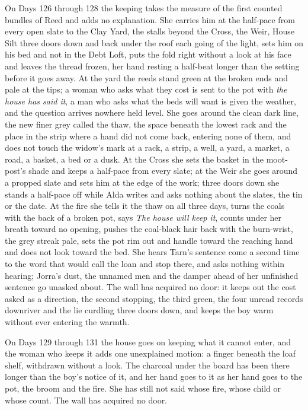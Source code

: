 \documentclass{design/chronicle}
\begin{document}
{On Days 126 through 128 the keeping takes the measure of the first counted bundles of Reed and adds no explanation. She carries him at the half-pace from every open slate to the Clay Yard, the stalls beyond the Cross, the Weir, House Silt three doors down and back under the roof each going of the light, sets him on his bed and not in the Debt Loft, puts the fold right without a look at his face and leaves the thread frozen, her hand resting a half-beat longer than the setting before it goes away. At the yard the reeds stand green at the broken ends and pale at the tips; a woman who asks what they cost is sent to the pot with \emph{the house has said it}, a man who asks what the beds will want is given the weather, and the question arrives nowhere held level. She goes around the clean dark line, the new finer grey called the thaw, the space beneath the lowest rack and the place in the strip where a hand did not come back, entering none of them, and does not touch the widow’s mark at a rack, a strip, a well, a yard, a market, a road, a basket, a bed or a dusk. At the Cross she sets the basket in the moot-post’s shade and keeps a half-pace from every slate; at the Weir she goes around a propped slate and sets him at the edge of the work; three doors down she stands a half-pace off while Alda writes and asks nothing about the slates, the tin or the date. At the fire she tells it the thaw on all three days, turns the coals with the back of a broken pot, says \emph{The house will keep it}, counts under her breath toward no opening, pushes the coal-black hair back with the burn-wrist, the grey streak pale, sets the pot rim out and handle toward the reaching hand and does not look toward the bed. She hears Tarn’s sentence come a second time to the word that would call the loan and stop there, and asks nothing within hearing; Jorra’s dust, the unnamed men and the damper ahead of her unfinished sentence go unasked about. The wall has acquired no door: it keeps out the cost asked as a direction, the second stopping, the third green, the four unread records downriver and the lie curdling three doors down, and keeps the boy warm without ever entering the warmth.

On Days 129 through 131 the house goes on keeping what it cannot enter, and the woman who keeps it adds one unexplained motion: a finger beneath the loaf shelf, withdrawn without a look. The charcoal under the board has been there longer than the boy’s notice of it, and her hand goes to it as her hand goes to the pot, the broom and the fire. She has still not said whose fire, whose child or whose count. The wall has acquired no door.

}
\end{document}
